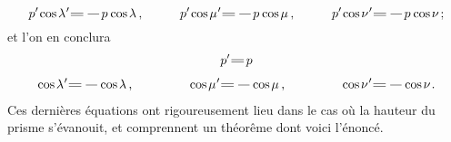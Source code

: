 \documentclass[11pt, twoside, leqno]{article}
\newcommand\equals{\scalebox{1.5}[1]{$=$}}
\newcommand\cosine{\operatorname{cos} \hspace{-0.1ex}}
\begin{document}
\begin{equation*}
p' \hspace{-0.2ex} \cosine \lambda\hspace{.1ex}' \equals \hspace{.3ex} \scalebox{1.5}[1]{$-$} \hspace{.1ex} p \hspace{.1ex} \cosine \lambda
\hspace{.4ex} \text{,}
\hspace{3em}
p' \hspace{-0.2ex} \cosine \mu\hspace{.1ex}' \equals \hspace{.3ex} \scalebox{1.5}[1]{$-$} \hspace{.1ex} p \hspace{.1ex} \cosine \mu
\hspace{.4ex} \text{,}
\hspace{3em}
p' \hspace{-0.2ex} \cosine \nu\hspace{.1ex}' \equals \hspace{.3ex} \scalebox{1.5}[1]{$-$} \hspace{.1ex} p \hspace{.1ex} \cosine \nu
\hspace{.3ex} \text{;}
\end{equation*}
et l'on en conclura\vspace{-0.5em}
\begin{equation*}\begin{gathered}
p' \equals \hspace{.2ex} p
\\[.4em]
%
\cosine \lambda\hspace{.1ex}' \equals \hspace{.3ex} \scalebox{1.5}[1]{$-$} \hspace{-0.1ex} \cosine \lambda
\hspace{.4ex} \text{,}
\hspace{4.4em}
\cosine \mu\hspace{.1ex}' \equals \hspace{.3ex} \scalebox{1.5}[1]{$-$} \hspace{-0.1ex} \cosine \mu
\hspace{.4ex} \text{,}
\hspace{4.4em}
\cosine \nu\hspace{.1ex}' \equals \hspace{.3ex} \scalebox{1.5}[1]{$-$} \hspace{-0.1ex} \cosine \nu
\hspace{.2ex} \text{.}
\end{gathered}\end{equation*}
Ces dernières équations ont rigoureusement lieu dans le cas où la hauteur du prisme s'évanouit, et comprennent un théorême dont voici l'énoncé.
\end{document}

